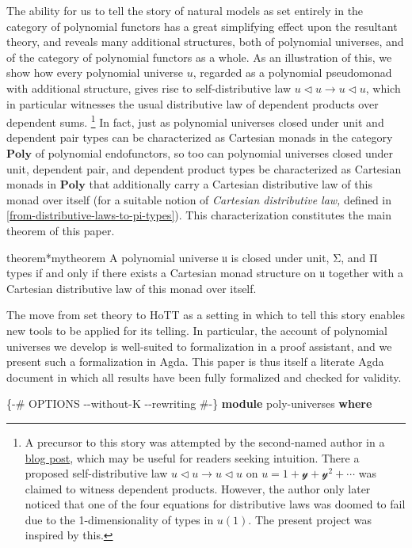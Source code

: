 \documentclass[
  11pt,
  oneside,
  article]{memoir}
\newenvironment{Shaded}{}{}
\newcommand{\KeywordTok}[1]{\textcolor[rgb]{0.00,0.44,0.13}{\textbf{#1}}}
\newcommand{\NormalTok}[1]{#1}
\newcommand{\PreprocessorTok}[1]{\textcolor[rgb]{0.74,0.48,0.00}{#1}}
\theoremstyle{definition}
\theoremstyle{plain}
\newcommand{\Cat}[1]{\mathbf{#1}}%
\newcommand{\yon}{\mathcal{y}}
\newcommand{\poly}{\Cat{Poly}}
\newcommand{\0}{\textsf{0}}
\newcommand{\1}{\tn{\textsf{1}}}
\newcommand{\tri}{\mathbin{\triangleleft}}
\begin{document}
The ability for us to tell the story of natural models as set entirely
in the category of polynomial functors has a great simplifying effect
upon the resultant theory, and reveals many additional structures, both
of polynomial universes, and of the category of polynomial functors as a
whole. As an illustration of this, we show how every polynomial universe
\(u\), regarded as a polynomial pseudomonad with additional structure,
gives rise to self-distributive law \(u\tri u\to u\tri u\), which in
particular witnesses the usual distributive law of dependent products
over dependent sums.%
\footnote{A precursor to this story was attempted by the second-named author in a \href{https://topos.site/blog/2021-07-01-jump-monads/}{blog post}, which may be useful for readers seeking intuition. There a proposed self-distributive law $u\tri u\to u\tri u$ on $u=1+\yon+\yon^2+\cdots$ was claimed to witness dependent products. However, the author only later noticed that one of the four equations for distributive laws was doomed to fail \cite{zwart2022no} due to the 1-dimensionality of types in $u(1)$. The present project was inspired by this.} %
In fact, just as polynomial universes closed under
unit and dependent pair types can be characterized as Cartesian monads
in the category \(\poly\) of polynomial endofunctors, so too can
polynomial universes closed under unit, dependent pair, and dependent
product types be characterized as Cartesian monads in \(\poly\) that
additionally carry a Cartesian distributive law of this monad over
itself (for a suitable notion of \emph{Cartesian distributive law,}
defined in \cref{from-distributive-laws-to-pi-types}). This characterization constitutes the main
theorem of this paper.
\begin{restatable}{theorem*}{mytheorem}
\label{thm:main}
A polynomial universe 𝔲 is closed under unit, Σ, and Π types if and only if there exists a Cartesian monad structure on 𝔲 together with a Cartesian distributive law of this monad over itself.
\end{restatable}

The move from set theory to HoTT as a setting in which to tell
this story enables new tools to be applied for its telling. In
particular, the account of polynomial universes we develop is
well-suited to formalization in a proof assistant, and we present such a
formalization in Agda. This paper is thus itself a literate Agda
document in which all results have been fully formalized and checked for
validity.

\begin{Shaded}
\begin{Highlighting}[]
\PreprocessorTok{\{{-}\# OPTIONS {-}{-}without{-}K {-}{-}rewriting \#{-}\}}
\KeywordTok{module}\NormalTok{ poly{-}universes }\KeywordTok{where}
\end{Highlighting}
\end{Shaded}
\end{document}
